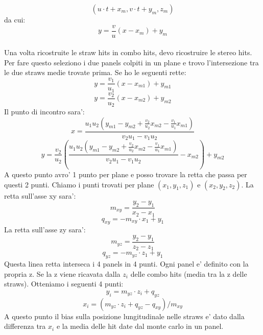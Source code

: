 $$ (u\cdot t + x_m,v\cdot t + y_m,z_m)$$
da cui:
$$y=\frac{v}{u}(x-x_m)+y_m$$
\\
Una volta ricostruite le straw hits in combo hits, devo ricostruire le stereo hits.
Per fare questo seleziono i due panels colpiti in un plane e trovo l'intersezione tra le due straws medie trovate prima. Se ho le seguenti rette:
$$y=\frac{v_1}{u_1}(x-x_{m1})+y_{m1}$$
$$y=\frac{v_2}{u_2}(x-x_{m2})+y_{m2}$$
Il punto di incontro sara':
$$x=\frac{u_1 u_2(y_{m1}-y_{m2}+\frac{v_2}{u_2}x_{m2}-\frac{v_1}{u_1}x_{m1})}{v_2 u_1 - v_1 u_2}$$
$$y=\frac{v_2}{u_2}\left(\frac{u_1 u_2(y_{m1}-y_{m2}+\frac{v_2}{u_2}x_{m2}-\frac{v_1}{u_1}x_{m1})}{v_2 u_1 - v_1 u_2}-x_{m2}\right)+y_{m2}$$
A questo punto avro' 1 punto per plane e posso trovare la retta che passa per questi 2 punti. Chiamo i punti trovati per plane $(x_1,y_1,z_1)$ e $(x_2,y_2,z_2)$.
La retta sull'asse xy sara':
$$ m_{xy}=\frac{y_2-y_1}{x_2-x_1}$$
$$ q_{xy}=-m_{xy} \cdot x_1+y_1$$
La retta sull'asse zy sara':
$$ m_{yz}=\frac{y_2-y_1}{z_2-z_1}$$
$$ q_{yz}=-m_{yz} \cdot z_1+y_1$$
Questa linea retta interseca i 4 panels in 4 punti. Ogni panel e' definito con la propria z. Se la z viene ricavata dalla $z_i$ delle combo hits (media tra la z delle straws). Otteniamo i seguenti 4 punti:
$$ y_i=m_{yz}\cdot z_i+q_{yz}$$
$$ x_i=(m_{yz}\cdot z_i+q_{yz}-q_{xy})/m_{xy}$$
A questo punto il bias sulla posizione lungitudinale nelle straws e' dato dalla differenza tra $x_i$ e la media delle hit date dal monte carlo in un panel.









